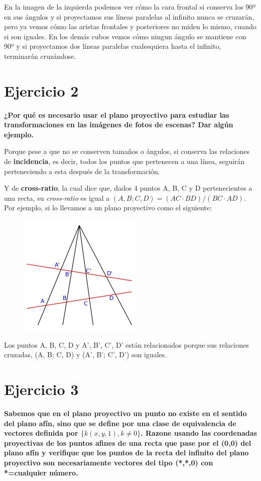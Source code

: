 \documentclass[11pt,a4paper]{article}
\begin{document}
En la imagen de la izquierda podemos ver cómo la cara frontal si conserva los 90º en sus ángulos y si proyectamos sus líneas paralelas al infinito
nunca se cruzarán, pero ya vemos cómo las aristas frontales y posteriores no miden lo mismo, cuando si son iguales. En los demás cubos vemos cómo
ningun ángulo se mantiene con 90º y si proyectamos dos líneas paralelas cualesquiera hasta el infinito, terminarán cruzándose. 



\section*{Ejercicio 2}
\textbf{¿Por qué es necesario usar el plano proyectivo para estudiar las transformaciones en las imágenes de fotos de escenas? Dar algún ejemplo.}

Porque pese a que no se conserven tamaños o ángulos, si conserva las relaciones de \textbf{incidencia}, es decir, todos los puntos que pertenecen a
una línea, seguirán perteneciendo a esta después de la transformación.

Y de \textbf{cross-ratio}, la cual dice que, dados 4 puntos A, B, C y D pertenecientes a una recta, su \textit{cross-ratio} es igual a $(A,B;C,D)=
(AC\cdot{BD})/(BC\cdot{AD})$. Por ejemplo, si lo llevamos a un plano proyectivo como el siguiente:
\begin{figure}[H]
\centering
\includegraphics[scale=0.6]{img/plano-proyectivo.jpg}
\end{figure}

Los puntos A, B, C, D y A', B', C', D' están relacionados porque sus relaciones cruzadas, (A, B; C, D) y (A', B'; C', D') son iguales.



\section*{Ejercicio 3}
\textbf{Sabemos que en el plano proyectivo un punto no existe en el sentido del plano afín, sino que se define por una clase de equivalencia de
vectores definida por $\{k(x,y,1),k\neq{0}\}$. Razone usando las coordenadas proyectivas de los puntos afines de una recta que pase por el (0,0)
del plano afín y verifique que los puntos de la recta del infinito del plano proyectivo son necesariamente vectores del tipo (*,*,0) con *=cualquier
número.}
\end{document}
